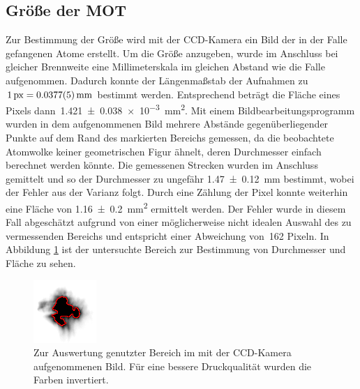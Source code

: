 \documentclass[11pt, a4paper]{article}
\numberwithin{equation}{section}
\begin{document}
\subsection{Größe der MOT}
Zur Bestimmung der Größe wird mit der CCD-Kamera ein Bild der in der Falle gefangenen Atome erstellt.
Um die Größe anzugeben, wurde im Anschluss bei gleicher Brennweite eine Millimeterskala im gleichen Abstand wie die Falle aufgenommen.
Dadurch konnte der Längenmaßstab der Aufnahmen zu~$\SI{1}{px}=\SI{0,0377+-0,0005}{mm}$ bestimmt werden.
Entsprechend beträgt die Fläche eines Pixels dann~\SI{1.421+-0.038e-3}{mm^2}.
Mit einem Bildbearbeitungsprogramm wurden in dem aufgenommenen Bild mehrere Abstände gegenüberliegender Punkte auf dem Rand des markierten Bereichs gemessen, da die beobachtete Atomwolke keiner geometrischen Figur ähnelt, deren Durchmesser einfach berechnet werden könnte.
Die gemessenen Strecken wurden im Anschluss gemittelt und so der Durchmesser zu ungefähr \SI{1,47+-0,12}{mm} bestimmt, wobei der Fehler aus der Varianz folgt.
Durch eine Zählung der Pixel konnte weiterhin eine Fläche von \SI{1,16+-0,2}{mm^2} ermittelt werden.
Der Fehler wurde in diesem Fall abgeschätzt aufgrund von einer möglicherweise nicht idealen Auswahl des zu vermessenden Bereichs und entspricht einer Abweichung von~\num{162} Pixeln.
In Abbildung \ref{fig:mot_groesse} ist der untersuchte Bereich zur Bestimmung von Durchmesser und Fläche zu sehen.
\begin{figure}[h]
	\centering
	\includegraphics[width=.7\textwidth]{./figures/size_inverted.png}
	\caption{Zur Auswertung genutzter Bereich im mit der CCD-Kamera aufgenommenen Bild. Für eine bessere Druckqualität wurden die Farben invertiert.}
	\label{fig:mot_groesse}
\end{figure}
\end{document}
